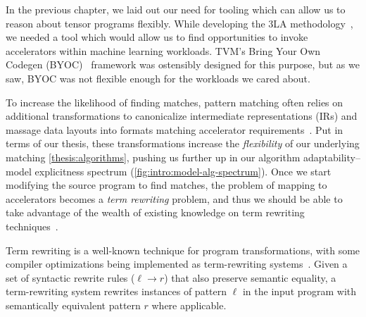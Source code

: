 
\vspace{10mm}
\noindent
In the previous chapter,
  we laid out our need
  for tooling
  which can allow us
  to reason about tensor programs
  flexibly.
While developing the 3LA methodology~\cite{huang2024application},
  we needed a 
  tool 
  which would allow us to find opportunities
  to invoke accelerators
  within machine learning workloads.
TVM's Bring Your Own Codegen (BYOC)~\cite{chen2021byoc} framework
  was ostensibly designed for this purpose,
  but as we saw,
  BYOC was not flexible enough
  for the workloads we cared about.
  

To increase the likelihood of finding matches,
  pattern matching often relies on
  additional transformations
  to canonicalize intermediate representations (IRs)
  and massage data layouts into
  formats matching accelerator requirements~\cite{nvidia2020nhwc,newcomb2020halide-rewrite,
  hagedorn2020func-high-perf}.
Put in terms of our thesis,
  these transformations increase the
  \textit{flexibility}
  of our underlying matching \cref{thesis:algorithms},
  pushing us further up in our 
  algorithm adaptability--model explicitness spectrum
  (\cref{fig:intro:model-alg-spectrum}).
Once we start modifying the source program
  to find matches,
  the problem of mapping to accelerators
  becomes a \textit{term rewriting} problem,
  and thus
  we should be able to take advantage of
  the wealth of existing knowledge on 
  term rewriting techniques~\cite{baader1998term}.

Term rewriting is a well-known technique 
  for program transformations,
  with some compiler optimizations being implemented
  as term-rewriting systems~\cite{
    dershowitz1993taste,
    baader1999term,
    blindell2016instruction,
    regis-pact22}.
Given a set of syntactic rewrite rules ($\ell \rightarrow r$) that also preserve semantic equality, 
  a term-rewriting system 
  rewrites instances of pattern $\ell$ 
  in the input program with semantically equivalent pattern $r$ where applicable.

